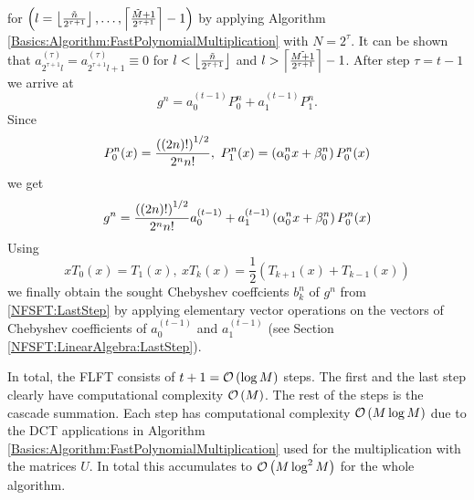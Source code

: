 for $\left(l=\left\lfloor\frac{\tilde{n}}{2^{\tau+1}}\right\rfloor,\ldots,\left\lceil\frac{\tilde{M}+1}{2^{\tau+1}}\right\rceil-1\right)$
by applying Algorithm \ref{Basics:Algorithm:FastPolynomialMultiplication} with $N=2^{\tau}$. It can be shown that
$a_{2^{\tau+1}l}^{(\tau)} = a_{2^{\tau+1}l+1}^{(\tau)} \equiv 0$ for $l < \left\lfloor\frac{\tilde{n}}{2^{\tau+1}}\right\rfloor$ and 
$l > \left\lceil\frac{\tilde{M+1}}{2^{\tau+1}}\right\rceil-1$.
After step $\tau = t-1$ we arrive at
\begin{equation}
  \nonumber
  g^n = a_{0}^{(t-1)} P_{0}^{n} + a_{1}^{(t-1)} P_{1}^{n}.
\end{equation}
Since 
\begin{equation}
  \nonumber
  P_{0}^n{\hspace{-0.4ex}}\left(x\right) = \frac{\left( \left( 2n \right) ! \right)^{1/2}}{2^n n!},\ P_{1}^n{\hspace{-0.4ex}}\left(x\right) = \left(\alpha_{0}^nx + \beta_{0}^n\right)P_{0}^n{\hspace{-0.4ex}}\left(x\right)
\end{equation} 
we get
\begin{equation}
  \label{NFSFT:LastStep}
  g^n = \frac{\left( \left( 2n \right) ! \right)^{1/2}}{2^n n!} a_{0}^{(t-1)} + a_{1}^{(t-1)} \left(\alpha_{0}^nx + \beta_{0}^n\right)P_{0}^n{\hspace{-0.4ex}}\left(x\right)
\end{equation}
Using 
\begin{equation}
  \nonumber
  xT_{0}(x) = T_{1}(x),\ xT_{k}(x) = \frac{1}{2}\left( T_{k+1}(x) + T_{k-1}(x) \right)
\end{equation}
we finally obtain the sought Chebyshev coeffcients $b_{k}^n$ of $g^n$ from \eqref{NFSFT:LastStep} by
applying elementary vector operations on the vectors of Chebyshev coefficients of $a_{0}^{(t-1)}$ and $a_{1}^{(t-1)}$ 
(see Section \ref{NFSFT:LinearAlgebra:LastStep}).

In total, the FLFT consists of $t+1 = \mathcal{O}\left(\log M\right)$ steps. The first and the last step clearly have computational complexity $\mathcal{O}\left(M\right)$. The rest of the steps is the cascade summation. Each step has computational complexity $\mathcal{O}\left(M \log M\right)$ due to the DCT applications in Algorithm \ref{Basics:Algorithm:FastPolynomialMultiplication} used for the multiplication with the matrices $U$. In total this accumulates to $\mathcal{O}\left(M \log^2 M\right)$ for the whole algorithm.

